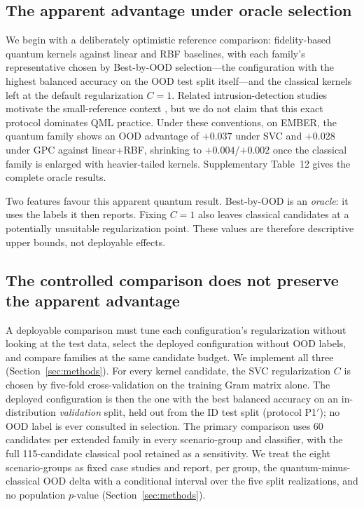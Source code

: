 \documentclass[referee,lineno,pdflatex,sn-vancouver-num]{sn-jnl}
\theoremstyle{thmstyleone}%
\theoremstyle{thmstyletwo}%
\theoremstyle{thmstylethree}%
\begin{document}
\subsection{The apparent advantage under oracle selection}
\label{sec:res_baselines}

We begin with a deliberately optimistic reference comparison: fidelity-based quantum kernels against linear and RBF baselines, with each family's representative chosen by Best-by-OOD selection---the configuration with the highest balanced accuracy on the OOD test split itself---and the classical kernels left at the default regularization $C=1$. Related intrusion-detection studies motivate the small-reference context \cite{abreu2024qmlids,abreu2025quantumnetsec,bellante2025evaluating}, but we do not claim that this exact protocol dominates QML practice. Under these conventions, on EMBER, the quantum family shows an OOD advantage of $+0.037$ under SVC and $+0.028$ under GPC against linear+RBF, shrinking to $+0.004$/$+0.002$ once the classical family is enlarged with heavier-tailed kernels. Supplementary Table~12 gives the complete oracle results.

Two features favour this apparent quantum result. Best-by-OOD is an \emph{oracle}: it uses the labels it then reports. Fixing $C=1$ also leaves classical candidates at a potentially unsuitable regularization point. These values are therefore descriptive upper bounds, not deployable effects.

\subsection{The controlled comparison does not preserve the apparent advantage}
\label{sec:res_honest}

A deployable comparison must tune each configuration's regularization without looking at the test data, select the deployed configuration without OOD labels, and compare families at the same candidate budget. We implement all three (Section~\ref{sec:methods}). For every kernel candidate, the SVC regularization $C$ is chosen by five-fold cross-validation on the training Gram matrix alone. The deployed configuration is then the one with the best balanced accuracy on an in-distribution \emph{validation} split, held out from the ID test split (protocol P1$'$); no OOD label is ever consulted in selection. The primary comparison uses 60 candidates per extended family in every scenario-group and classifier, with the full 115-candidate classical pool retained as a sensitivity. We treat the eight scenario-groups as fixed case studies and report, per group, the quantum-minus-classical OOD delta with a conditional interval over the five split realizations, and no population $p$-value (Section~\ref{sec:methods}).
\end{document}
